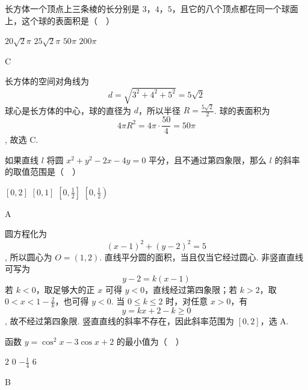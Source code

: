 \documentclass[UTF8,a4paper,oneside,11pt]{ctexbook}
\begin{document}
\begin{problem}
长方体一个顶点上三条棱的长分别是 \(3\)，\(4\)，\(5\)，且它的八个顶点都在同一个球面上，这个球的表面积是（\(\quad\)）

\choices
    {\(20\sqrt{2}\pi\)}
    {\(25\sqrt{2}\pi\)}
    {\(50\pi\)}
    {\(200\pi\)}

\end{problem}

\begin{answer}
C
\end{answer}

\begin{solution}
长方体的空间对角线为
\[
d=\sqrt{3^2+4^2+5^2}=5\sqrt2
\]
球心是长方体的中心，球的直径为 \(d\)，所以半径 \(R=\frac{5\sqrt2}{2}\). 球的表面积为
\[
4\pi R^2=4\pi\cdot\frac{50}{4}=50\pi
\],
故选 C.
\end{solution}

\begin{problem}
如果直线 \(l\) 将圆 \(x^{2} + y^{2} - 2x - 4y = 0\) 平分，且不通过第四象限，那么 \(l\) 的斜率的取值范围是（\(\quad\)）

\choices
    {\([0,2]\)}
    {\([0,1]\)}
    {\(\left[0, \frac{1}{2}\right]\)}
    {\(\left[0, \frac{1}{2}\right)\)}

\end{problem}

\begin{answer}
A
\end{answer}

\begin{solution}
圆方程化为
\[
(x-1)^2+(y-2)^2=5
\],
所以圆心为 \(O=(1,2)\). 直线平分圆的面积，当且仅当它经过圆心. 非竖直直线可写为
\[
y-2=k(x-1)
\]
若 \(k<0\)，取足够大的正 \(x\) 可得 \(y<0\)，直线经过第四象限；若 \(k>2\)，取 \(0<x<1-\frac2k\)，也可得 \(y<0\). 当 \(0\leqslant k\leqslant2\) 时，对任意 \(x>0\)，有
\[
y=kx+2-k\geqslant0
\],
故不经过第四象限. 竖直直线的斜率不存在，因此斜率范围为 \([0,2]\)，选 A.
\end{solution}

\begin{problem}
函数 \(y = \cos^2 x - 3\cos x + 2\) 的最小值为（\(\quad\)）

\choices
    {\(2\)}
    {\(0\)}
    {\(-\frac{1}{4}\)}
    {\(6\)}

\end{problem}

\begin{answer}
B
\end{answer}
\end{document}
